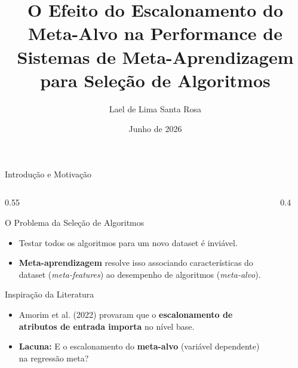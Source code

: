 \documentclass[aspectratio=169, 10pt]{beamer}
\title[Escalonamento do Meta-Alvo em Meta-Aprendizagem]{O Efeito do Escalonamento do Meta-Alvo na Performance de Sistemas de Meta-Aprendizagem para Seleção de Algoritmos}
\author[Lael Santa Rosa]{Lael de Lima Santa Rosa}
\institute[UFAL]{Instituto de Computação \\ Universidade Federal de Alagoas (UFAL)}
\date{Junho de 2026}
\begin{document}
\begin{frame}
  \titlepage
\end{frame}

\begin{frame}{Introdução e Motivação}
  \begin{columns}[T]
    \begin{column}{0.55\textwidth}
      \begin{block}{O Problema da Seleção de Algoritmos}
        \begin{itemize}
          \item Testar todos os algoritmos para um novo dataset é inviável.
          \item \textbf{Meta-aprendizagem} resolve isso associando características do dataset (\textit{meta-features}) ao desempenho de algoritmos (\textit{meta-alvo}).
        \end{itemize}
      \end{block}
      \begin{block}{Inspiração da Literatura}
        \begin{itemize}
          \item Amorim et al. (2022) provaram que o \textbf{escalonamento de atributos de entrada importa} no nível base.
          \item \textbf{Lacuna:} E o escalonamento do \textbf{meta-alvo} (variável dependente) na regressão meta?
        \end{itemize}
      \end{block}
    \end{column}
    
    \begin{column}{0.4\textwidth}
      \begin{figure}
        \centering
\end{figure}
\end{column}
\end{columns}
\end{frame}
\end{document}
